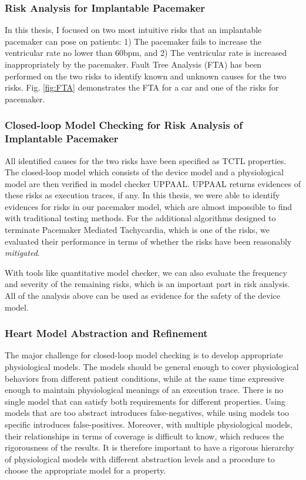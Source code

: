 \documentclass[a4paper]{article}
\begin{document}
\subsubsection{Risk Analysis for Implantable Pacemaker}
In this thesis, I focused on two most intuitive risks that an implantable pacemaker can pose on patients: 1) The pacemaker fails to increase the ventricular rate no lower than 60bpm, and 2) The ventricular rate is increased inappropriately by the pacemaker.
Fault Tree Analysis (FTA) has been performed on the two risks to identify known and unknown causes for the two risks. 
Fig. \ref{fig:FTA} demonstrates the FTA for a car and one of the risks for pacemaker.
\subsubsection{Closed-loop Model Checking for Risk Analysis of Implantable Pacemaker}
All identified causes for the two risks have been specified as TCTL properties.
The closed-loop model which consists of the device model and a physiological model are then verified in model checker UPPAAL.
UPPAAL returns evidences of these risks as execution traces, if any.
In this thesis, we were able to identify evidences for risks in our pacemaker model, which are almost impossible to find with traditional testing methods.
For the additional algorithms designed to terminate Pacemaker Mediated Tachycardia, which is one of the risks, we evaluated their performance in terms of whether the risks have been reasonably \emph{mitigated}.

With tools like quantitative model checker, we can also evaluate the frequency and severity of the remaining risks, which is an important part in risk analysis.
All of the analysis above can be used as evidence for the safety of the device model.
\subsubsection{Heart Model Abstraction and Refinement}

The major challenge for closed-loop model checking is to develop appropriate physiological models. 
The models should be general enough to cover physiological behaviors from different patient conditions, while at the same time expressive enough to maintain physiological meanings of an execution trace.
There is no single model that can satisfy both requirements for different properties.
Using models that are too abstract introduces false-negatives, while using models too specific introduces false-positives.
Moreover, with multiple physiological models, their relationships in terms of coverage is difficult to know, which reduces the rigorousness of the results.
It is therefore important to have a rigorous hierarchy of physiological models with different abstraction levels and a procedure to choose the appropriate model for a property.
\end{document}

